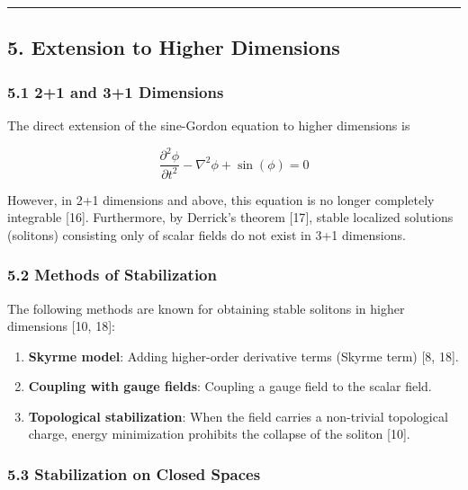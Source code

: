 \documentclass[a4paper,11pt]{article}
\providecommand{\tightlist}{\setlength{\itemsep}{0pt}\setlength{\parskip}{0pt}}
\begin{document}
\begin{center}\rule{0.5\linewidth}{0.5pt}\end{center}

\subsection{5. Extension to Higher
Dimensions}\label{extension-to-higher-dimensions}

\subsubsection{5.1 2+1 and 3+1 Dimensions}\label{and-31-dimensions}

The direct extension of the sine-Gordon equation to higher dimensions is

\[\frac{\partial^2\phi}{\partial t^2} - \nabla^2\phi + \sin(\phi) = 0\]

However, in 2+1 dimensions and above, this equation is no longer
completely integrable {[}16{]}. Furthermore, by Derrick's theorem
{[}17{]}, stable localized solutions (solitons) consisting only of
scalar fields do not exist in 3+1 dimensions.

\subsubsection{5.2 Methods of
Stabilization}\label{methods-of-stabilization}

The following methods are known for obtaining stable solitons in higher
dimensions {[}10, 18{]}:

\begin{enumerate}
\def\labelenumi{\arabic{enumi}.}
\tightlist
\item
  \textbf{Skyrme model}: Adding higher-order derivative terms (Skyrme
  term) {[}8, 18{]}.
\item
  \textbf{Coupling with gauge fields}: Coupling a gauge field to the
  scalar field.
\item
  \textbf{Topological stabilization}: When the field carries a
  non-trivial topological charge, energy minimization prohibits the
  collapse of the soliton {[}10{]}.
\end{enumerate}

\subsubsection{5.3 Stabilization on Closed
Spaces}\label{stabilization-on-closed-spaces}
\end{document}
